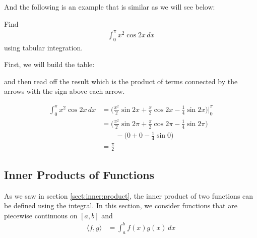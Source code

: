 And the following is an example that is similar as we will see below:
%
\begin{example}
Find 
\begin{align*}
\int_0^{\pi} x^2 \cos 2x \, dx 
\end{align*}
using tabular integration. 

\solution

First, we will build the table:

\begin{center}
\end{center}
and then read off the result which is the product of terms connected by the arrows with the sign above each arrow. 

\begin{align*}
\int_0^{\pi} x^2 \cos 2x \, dx & = \biggl( \frac{x^2}{2} \sin 2x + \frac{x}{2} \cos 2x - \frac{1}{4} \sin 2x \biggr) \biggr \vert_{0}^{\pi} \\
& = \biggl(\frac{\pi^2}{2} \sin 2\pi + \frac{\pi}{2} \cos 2\pi - \frac{1}{4} \sin 2\pi \biggr) \\
& \qquad - \biggl(0 + 0 - \frac{1}{4} \sin 0 \biggr) \\
& = \frac{\pi}{2} 
\end{align*}

\end{example}



\subsection{Inner Products of Functions}

As we saw in section \ref{sect:inner:product}, the inner product of two functions can be defined using the integral.  In this section, we consider functions that are piecewise continuous on $[a,b]$ and 
% 
\begin{align*}
\langle f, g \rangle & = \int_a^b f(x) g(x) \, dx 
\end{align*}


